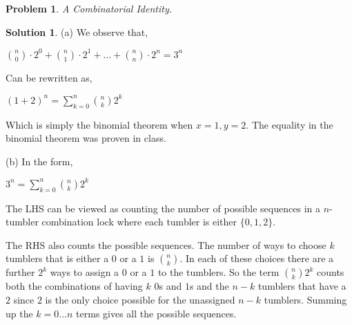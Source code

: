\documentclass{article}
\newtheorem{problem}{Problem}
\theoremstyle{definition}
\newtheorem*{solution}{Solution}
\begin{document}
\begin{problem} 

A Combinatorial Identity.

\end{problem}

\begin{solution}

(a) We observe that,

\(\binom{n}{0}\cdot 2^0+\binom{n}{1}\cdot 2^1+...+\binom{n}{n}\cdot 2^n=3^n\)

Can be rewritten as,

\((1+2)^n=\sum\limits_{k=0}^n \binom{n}{k} 2^k\)

Which is simply the binomial theorem when \(x=1,y=2\). The equality in the binomial theorem was proven in class.

(b) In the form,

\(3^n=\sum\limits_{k=0}^n \binom{n}{k} 2^k\)

The LHS can be viewed as counting the number of possible sequences in a \(n\)-tumbler combination lock where each tumbler is either \(\{0,1,2\}\).

The RHS also counts the possible sequences. The number of ways to choose \(k\) tumblers that is either a \(0\) or a \(1\) is \(\binom{n}{k}\). In each of these choices there are a further \(2^k\) ways to assign a \(0\) or a \(1\) to the tumblers. So the term \(\binom{n}{k} 2^k\) counts both the combinations of having \(k\) \(0\)s and \(1\)s and the \(n-k\) tumblers that have a \(2\) since \(2\) is the only choice possible for the unassigned \(n-k\) tumblers. Summing up the \(k=0...n\) terms gives all the possible sequences.

\end{solution}
\end{document}
